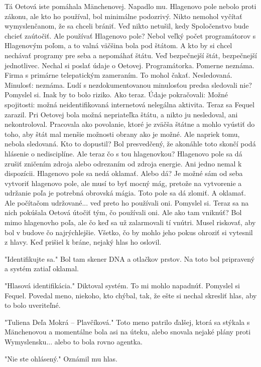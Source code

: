 \documentclass{book}
\begin{document}
Tá Oetová iste pomáhala Mänchenovej. Napadlo mu. Hlagenovo pole nebolo proti zákonu, ale kto ho používal, bol minimálne podozrivý. Nikto nemohol vyčítať wymyslenčanom, že sa chceli brániť. Veď nikto netušil, kedy Spoločenstvo bude chcieť zaútočiť. Ale používať Hlagenovo pole? Nebol veľký počet programátorov s Hlagenovým poľom, a to valná väčšina bola pod štátom. A kto by si chcel nechávať programy pre seba a nepomáhať štátu. Veď bezpečnejší štát, bezpečnejší jednotlivec. Nechal si poslať údaje o Oetovej. Programátorka. Pomerne neznáma. Firma s primárne telepatickým zameraním. To mohol čakať. Nesledovaná. Minulosť: neznáma. Ľudí s nezdokumentovanou minulosťou predsa sledovali nie? Pomyslel si. Inak by to bolo riziko. Ako teraz. Údaje pokračovali: Možné spojitosti: možná neidentifikovaná internetová nelegálna aktivita. Teraz sa Fequel zarazil. Pri Oetovej bola možná nepriateľka štátu, a nikto ju nesledoval, ani nekontroloval. Pracovala ako povolanie, ktoré je zväčša štátne a mohlo vyústiť do toho, aby štát mal menšie možnosti obrany ako je možné. Ale napriek tomu, nebola sledovaná. Kto to dopustil? Bol presvedčený, že akonáhle toto skončí podá hlásenie o nedisciplíne. Ale teraz čo s tou hlagenovkou? Hlagenovo pole sa dá zrušiť zničením zdroja alebo odrezaním od zdroja energie. Ani jedno nemal k dispozícii. Hlagenovo pole sa nedá oklamať. Alebo dá? Je možné sám od seba vytvoriť hlagenovo pole, ale musí to byť mocný mág, pretože na vytvorenie a udržanie poľa je potrebná obrovská mágia. Toto pole sa dá zlomiť. A oklamať. Ale počítačom udržované... veď preto ho používali oni. Pomyslel si. Teraz sa na nich pokúšala Oetová útočiť tým, čo používali oni. Ale ako tam vniknúť? Bol mimo hlagenovho poľa, ale čo keď sa už zalarmovali tí vnútri. Musel riskovať, aby bol v budove čo najrýchlejšie. Všetko, čo by mohlo jeho pokus ohroziť si vytesnil z hlavy. Keď prišiel k bráne, nejaký hlas ho oslovil.

"$ $Identifikujte sa."$ $  Bol tam skener DNA a otlačkov prstov. Na toto bol pripravený a systém zatiaľ oklamal.

"$ $Hlasová identifikácia."$ $  Diktoval systém. To mi mohlo napadnúť. Pomyslel si Fequel. Povedal meno, niekoho, kto chýbal, tak, že ešte si nechal skresliť hlas, aby to bolo uveriteľné.

"$ $Tuliena Deľa Mokrá – Plavčíková."$ $  Toto meno patrilo ďalšej, ktorá sa stýkala s Mänchenovou a momentálne bola asi na úteku, alebo snovala nejaké plány proti Wymyslensku... alebo to bola rovno agentka.

"$ $Nie ste ohlásený."$ $  Oznámil mu hlas.
\end{document}
